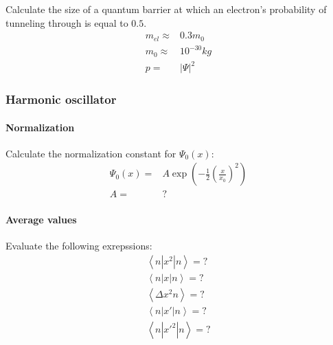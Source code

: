 				Calculate the size of a quantum barrier at which an electron's probability of tunneling through is equal to $0.5$.
				\begin{align}
					m_{el} \approx& 0.3 m_0 \\
					m_0 \approx& 10^{-30}\si{kg} \\
					p =& |\Psi|^2
				\end{align}
		\subsubsection{Harmonic oscillator}
			\paragraph{Normalization}
				Calculate the normalization constant for $\Psi_0(x)$:
				\begin{align}
					\Psi_0(x) =& A \exp\left(-\frac{1}{2}\left(\frac{x}{x_0}\right)^2\right) \\
					A =& ?
				\end{align}
			\paragraph{Average values}
				Evaluate the following exrepssions:
				\begin{align}
					\left\langle n|x^2| n\right\rangle = ?\\
					\left\langle n|x| n\right\rangle = ?\\
					\left\langle \Delta x^2 n\right\rangle = ?\\
					\left\langle n|x'| n\right\rangle = ?\\
					\left\langle n|x'^2| n\right\rangle = ? \\																				
				\end{align}				
			